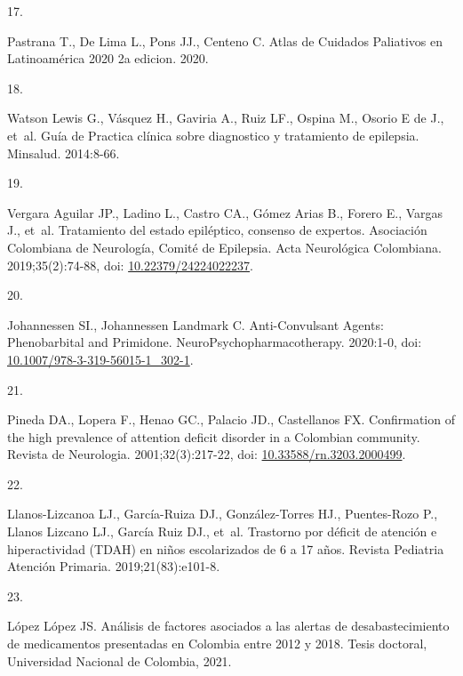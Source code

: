 \documentclass[
]{book}
\newlength{\cslhangindent}
\newlength{\csllabelwidth}
\newlength{\cslentryspacingunit} %
\newenvironment{CSLReferences}[2] %
 {%
  \setlength{\parindent}{0pt}
  \ifodd #1
  \let\oldpar\par
  \def\par{\hangindent=\cslhangindent\oldpar}
  \fi
  \setlength{\parskip}{#2\cslentryspacingunit}
 }%
 {}
\newcommand{\CSLLeftMargin}[1]{\parbox[t]{\csllabelwidth}{#1}}
\newcommand{\CSLRightInline}[1]{\parbox[t]{\linewidth - \csllabelwidth}{#1}\break}
\begin{document}
\begin{CSLReferences}{0}{0}
\leavevmode{}%
\CSLLeftMargin{17. }
\CSLRightInline{Pastrana T., De Lima L., Pons JJ., Centeno C. {Atlas de Cuidados Paliativos en Latinoam{é}rica 2020 2a edicion}. 2020.}

\leavevmode{}%
\CSLLeftMargin{18. }
\CSLRightInline{Watson Lewis G., Vásquez H., Gaviria A., Ruiz LF., Ospina M., Osorio E de J., et~al. {Gu{í}a de Practica cl{í}nica sobre diagnostico y tratamiento de epilepsia}. Minsalud. 2014:8-66.}

\leavevmode{}%
\CSLLeftMargin{19. }
\CSLRightInline{Vergara Aguilar JP., Ladino L., Castro CA., Gómez Arias B., Forero E., Vargas J., et~al. {Tratamiento del estado epil{é}ptico, consenso de expertos. Asociaci{ó}n Colombiana de Neurolog{í}a, Comit{é} de Epilepsia}. Acta Neurol{ó}gica Colombiana. 2019;35(2):74-88, doi: \href{https://doi.org/10.22379/24224022237}{10.22379/24224022237}.}

\leavevmode{}%
\CSLLeftMargin{20. }
\CSLRightInline{Johannessen SI., Johannessen Landmark C. {Anti-Convulsant Agents: Phenobarbital and Primidone}. NeuroPsychopharmacotherapy. 2020:1-0, doi: \href{https://doi.org/10.1007/978-3-319-56015-1_302-1}{10.1007/978-3-319-56015-1\_302-1}.}

\leavevmode{}%
\CSLLeftMargin{21. }
\CSLRightInline{Pineda DA., Lopera F., Henao GC., Palacio JD., Castellanos FX. {Confirmation of the high prevalence of attention deficit disorder in a Colombian community}. Revista de Neurologia. 2001;32(3):217-22, doi: \href{https://doi.org/10.33588/rn.3203.2000499}{10.33588/rn.3203.2000499}.}

\leavevmode{}%
\CSLLeftMargin{22. }
\CSLRightInline{Llanos-Lizcanoa LJ., García-Ruiza DJ., González-Torres HJ., Puentes-Rozo P., Llanos Lizcano LJ., García Ruiz DJ., et~al. {Trastorno por d{é}ficit de atenci{ó}n e hiperactividad (TDAH) en ni{ñ}os escolarizados de 6 a 17 a{ñ}os}. Revista Pediatria Atenci{ó}n Primaria. 2019;21(83):e101-8.}

\leavevmode{}%
\CSLLeftMargin{23. }
\CSLRightInline{López López JS. {An{á}lisis de factores asociados a las alertas de desabastecimiento de medicamentos presentadas en Colombia entre 2012 y 2018}. Tesis doctoral, Universidad Nacional de Colombia, 2021.}


\end{CSLReferences}
\end{document}
